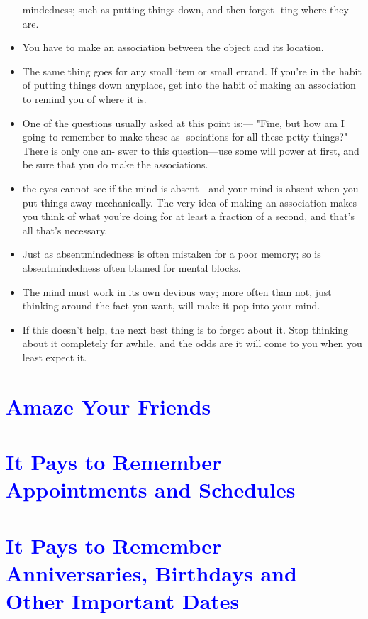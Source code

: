 \begin{itemize}
            mindedness; such as putting things down, and then forget-
            ting where they are.
            \item You have to make an association between
            the object and its location.
            \item The same thing
            goes for any small item or small errand. If you're in the
            habit of putting things down anyplace, get into the habit
            of making an association to remind you of where it is.
            \item One of the questions usually asked at this point is:—
            "Fine, but how am I going to remember to make these as-
            sociations for all these petty things?" There is only one an-
            swer to this question—use some will power at first, and
            be sure that you do make the associations.
            \item the eyes cannot
            see if the mind is absent—and your mind is absent when
            you put things away mechanically. The very idea of making
            an association makes you think of what you're doing for at
            least a fraction of a second, and that's all that's necessary.
            \item Just as absentmindedness is often mistaken for a poor
            memory; so is absentmindedness often blamed for mental
            blocks.
            \item The mind must work in its own devious way; more
            often than not, just thinking around the fact you want, will
            make it pop into your mind.
            \item If this doesn't help, the next best thing is to forget about
            it. Stop thinking about it completely for awhile, and the
            odds are it will come to you when you least expect it.
        \end{itemize}
    \section* {\textcolor{blue}{Amaze Your Friends}}
    \section* {\textcolor{blue}{It Pays to Remember Appointments and Schedules}}
    \section* {\textcolor{blue}{It Pays to Remember Anniversaries, Birthdays and Other Important Dates}}
